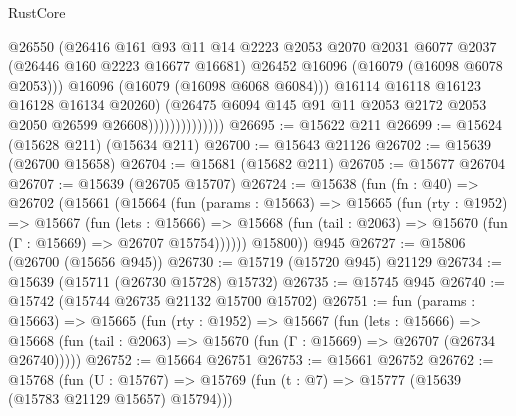 \begin{lexlean}{RustCore}
\begin{coremodule}
                                  @26550
                                  (@26416
                                    @161
                                    @93
                                    @11
                                    @14
                                    @2223
                                    @2053
                                    @2070
                                    @2031
                                    @6077
                                    @2037
                                    (@26446 @160 @2223 @16677 @16681)
                                    @26452
                                    @16096
                                    (@16079 (@16098 @6078 @2053)))
                                  @16096
                                  (@16079 (@16098 @6068 @6084)))
                                @16114
                                @16118
                                @16123
                                @16128
                                @16134
                                @20260)
                              (@26475
                                @6094
                                @145
                                @91
                                @11
                                @2053
                                @2172
                                @2053
                                @2050
                                @26599
                                @26608))))))))))))))
@26695 := @15622 @211
@26699 := @15624 (@15628 @211) (@15634 @211)
@26700 := @15643 @21126
@26702 := @15639 (@26700 @15658)
@26704 := @15681 (@15682 @211)
@26705 := @15677 @26704
@26707 := @15639 (@26705 @15707)
@26724 := @15638
    (fun (fn : @40) =>
    @26702
      (@15661
        (@15664
          (fun (params : @15663) =>
          @15665
            (fun (rty : @1952) =>
            @15667
              (fun (lets : @15666) =>
              @15668 (fun (tail : @2063) => @15670 (fun (Γ : @15669) => @26707 @15754))))))
        @15800))
    @945
@26727 := @15806 (@26700 (@15656 @945))
@26730 := @15719 (@15720 @945) @21129
@26734 := @15639 (@15711 (@26730 @15728) @15732)
@26735 := @15745 @945
@26740 := @15742 (@15744 @26735 @21132 @15700 @15702)
@26751 := fun (params : @15663) =>
  @15665
    (fun (rty : @1952) =>
    @15667
      (fun (lets : @15666) =>
      @15668 (fun (tail : @2063) => @15670 (fun (Γ : @15669) => @26707 (@26734 @26740)))))
@26752 := @15664 @26751
@26753 := @15661 @26752
@26762 := @15768
    (fun (U : @15767) => @15769 (fun (t : @7) => @15777 (@15639 (@15783 @21129 @15657) @15794)))

\end{coremodule}
\end{lexlean}
